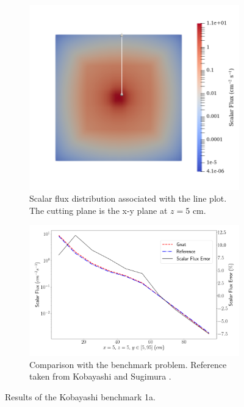 \begin{figure}[H]
    \centering
    \begin{subfigure}[b]{0.4\textwidth}
        \centering
        \includegraphics[width=\textwidth]{images/verification/sn_kobayashi/1/kobayashi_1a_flux_map.png}
        \caption{Scalar flux distribution associated with the line plot. The cutting plane is the x-y plane at $z = 5\text{ cm}$.}
        \label{fig:verification:sn_kobayashi_1a:flux}
    \end{subfigure}
    \hfill
    \begin{subfigure}[b]{0.59\textwidth}
        \centering
        \includegraphics[width=\textwidth]{images/verification/sn_kobayashi/1/kobayashi_1a.png}
        \caption{Comparison with the benchmark problem. Reference taken from Kobayashi and Sugimura \cite{kobayashi_benchmarks}.}
        \label{fig:verification:sn_kobayashi_1a:line_plot}
    \end{subfigure}
    \caption{Results of the Kobayashi benchmark 1a.}
    \label{fig:verification:sn_kobayashi_1a}
\end{figure}

